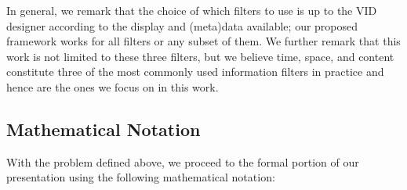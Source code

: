 In general, we remark that the choice of which filters to use is up to the VID designer according to the display and (meta)data available; our proposed framework works for all filters or any subset of them.  We further remark that this work is not limited to these three filters, but we believe time, space, and content constitute three of the most commonly used information filters in practice and hence are the ones we focus on in this work.

\subsection{Mathematical Notation}

With the problem defined above, we proceed to the formal portion of our presentation using  
the following mathematical notation:

